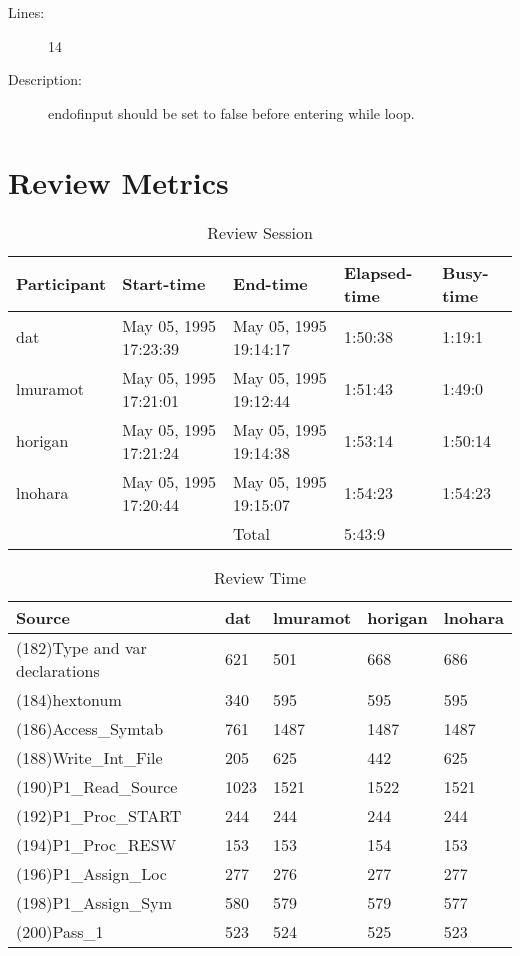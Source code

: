 \begin{enumerate}
\begin{description}
\item [Lines:] 14

\item [Description:] endofinput should be set to false before
entering while loop.
\end{description}
\end{enumerate}
\section{Review Metrics}
\begin{table}[hb]
\begin{center}
\begin{tabular}{|l|l|l|l|l|}
\hline
Participant & Start-time & End-time & Elapsed-time & Busy-time \\
\hline
dat & May 05, 1995 17:23:39 & May 05, 1995 19:14:17 & 1:50:38 & 1:19:1 \\
lmuramot & May 05, 1995 17:21:01 & May 05, 1995 19:12:44 & 1:51:43 & 1:49:0 \\
horigan & May 05, 1995 17:21:24 & May 05, 1995 19:14:38 & 1:53:14 & 1:50:14 \\
lnohara & May 05, 1995 17:20:44 & May 05, 1995 19:15:07 & 1:54:23 & 1:54:23 \\
\hline
 & & Total & 5:43:9 & \\
\hline
\end{tabular}
\end{center}
\caption{Review Session}
\end{table}


\begin{table}[hb]
\begin{center}
\begin{tabular}{|l|l|l|l|l|}
\hline
Source & dat & lmuramot & horigan & lnohara\\
\hline
(182)Type and var declarations & 621 & 501 & 668 & 686\\
(184)hextonum & 340 & 595 & 595 & 595\\
(186)Access\_Symtab & 761 & 1487 & 1487 & 1487\\
(188)Write\_Int\_File & 205 & 625 & 442 & 625\\
(190)P1\_Read\_Source & 1023 & 1521 & 1522 & 1521\\
(192)P1\_Proc\_START & 244 & 244 & 244 & 244\\
(194)P1\_Proc\_RESW & 153 & 153 & 154 & 153\\
(196)P1\_Assign\_Loc & 277 & 276 & 277 & 277\\
(198)P1\_Assign\_Sym & 580 & 579 & 579 & 577\\
(200)Pass\_1 & 523 & 524 & 525 & 523\\
\hline
\end{tabular}
\end{center}
\caption{Review Time}
\end{table}

